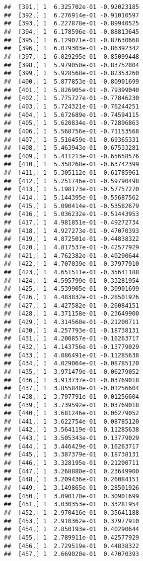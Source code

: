 \documentclass[
  12pt,
]{article}
\begin{document}
\begin{verbatim}
##  [391,] 1  6.325702e-01 -0.92023185
##  [392,] 1  6.276914e-01 -0.91010597
##  [393,] 1  6.227878e-01 -0.89940525
##  [394,] 1  6.178596e-01 -0.88813645
##  [395,] 1  6.129071e-01 -0.87630668
##  [396,] 1  6.079303e-01 -0.86392342
##  [397,] 1  6.029295e-01 -0.85099448
##  [398,] 1  5.979050e-01 -0.83752804
##  [399,] 1  5.928568e-01 -0.82353260
##  [400,] 1  5.877853e-01 -0.80901699
##  [401,] 1  5.826905e-01 -0.79399040
##  [402,] 1  5.775727e-01 -0.77846230
##  [403,] 1  5.724321e-01 -0.76244251
##  [404,] 1  5.672689e-01 -0.74594115
##  [405,] 1  5.620834e-01 -0.72896863
##  [406,] 1  5.568756e-01 -0.71153568
##  [407,] 1  5.516459e-01 -0.69365331
##  [408,] 1  5.463943e-01 -0.67533281
##  [409,] 1  5.411213e-01 -0.65658576
##  [410,] 1  5.358268e-01 -0.63742399
##  [411,] 1  5.305112e-01 -0.61785961
##  [412,] 1  5.251746e-01 -0.59790498
##  [413,] 1  5.198173e-01 -0.57757270
##  [414,] 1  5.144395e-01 -0.55687562
##  [415,] 1  5.090414e-01 -0.53582679
##  [416,] 1  5.036232e-01 -0.51443953
##  [417,] 1  4.981851e-01 -0.49272734
##  [418,] 1  4.927273e-01 -0.47070393
##  [419,] 1  4.872501e-01 -0.44838322
##  [420,] 1  4.817537e-01 -0.42577929
##  [421,] 1  4.762382e-01 -0.40290644
##  [422,] 1  4.707039e-01 -0.37977910
##  [423,] 1  4.651511e-01 -0.35641188
##  [424,] 1  4.595799e-01 -0.33281954
##  [425,] 1  4.539905e-01 -0.30901699
##  [426,] 1  4.483832e-01 -0.28501926
##  [427,] 1  4.427582e-01 -0.26084151
##  [428,] 1  4.371158e-01 -0.23649900
##  [429,] 1  4.314560e-01 -0.21200711
##  [430,] 1  4.257793e-01 -0.18738131
##  [431,] 1  4.200857e-01 -0.16263717
##  [432,] 1  4.143756e-01 -0.13779029
##  [433,] 1  4.086491e-01 -0.11285638
##  [434,] 1  4.029064e-01 -0.08785120
##  [435,] 1  3.971479e-01 -0.06279052
##  [436,] 1  3.913737e-01 -0.03769018
##  [437,] 1  3.855840e-01 -0.01256604
##  [438,] 1  3.797791e-01  0.01256604
##  [439,] 1  3.739592e-01  0.03769018
##  [440,] 1  3.681246e-01  0.06279052
##  [441,] 1  3.622754e-01  0.08785120
##  [442,] 1  3.564119e-01  0.11285638
##  [443,] 1  3.505343e-01  0.13779029
##  [444,] 1  3.446429e-01  0.16263717
##  [445,] 1  3.387379e-01  0.18738131
##  [446,] 1  3.328195e-01  0.21200711
##  [447,] 1  3.268880e-01  0.23649900
##  [448,] 1  3.209436e-01  0.26084151
##  [449,] 1  3.149865e-01  0.28501926
##  [450,] 1  3.090170e-01  0.30901699
##  [451,] 1  3.030353e-01  0.33281954
##  [452,] 1  2.970416e-01  0.35641188
##  [453,] 1  2.910362e-01  0.37977910
##  [454,] 1  2.850193e-01  0.40290644
##  [455,] 1  2.789911e-01  0.42577929
##  [456,] 1  2.729519e-01  0.44838322
##  [457,] 1  2.669020e-01  0.47070393

\end{verbatim}
\end{document}
